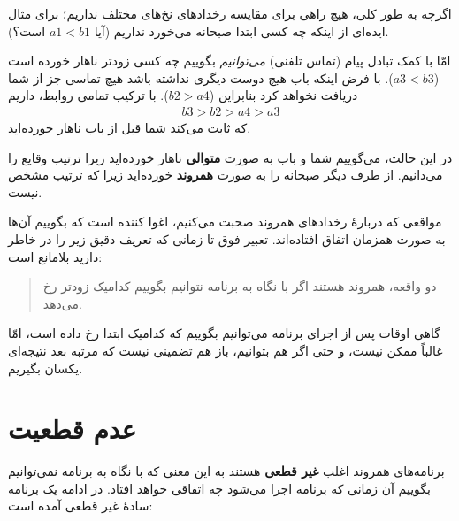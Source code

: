 \documentclass{book}
\begin{document}
    اگرچه به طور کلی، هیچ راهی برای مقایسه رخدادهای نخ‌های مختلف نداریم؛ برای مثال ایده‌ای از اینکه چه کسی ابتدا صبحانه می‌خورد نداریم 
    (آیا $a1 < b1$  است؟).
    
    امّا با کمک تبادل پیام (تماس تلفنی) \emph{می‌توانیم} بگوییم چه کسی زودتر ناهار خورده است ($a3 < b3$).
    با فرض اینکه باب هیچ دوست دیگری نداشته باشد هیچ تماسی جز از شما دریافت نخواهد کرد بنابراین  ($b2 > a4$).
    با ترکیب تمامی روابط، داریم 
%
\begin{eqnarray*}
b3 > b2 > a4 > a3
\end{eqnarray*}
%
    که ثابت می‌کند شما قبل از باب ناهار خورده‌اید. 

    در این حالت، می‌گوییم شما و باب به صورت \textbf{متوالی} ناهار خورده‌اید زیرا 
    ترتیب وقایع را می‌دانیم. از طرف دیگر صبحانه را به صورت  \textbf{همروند} خورده‌اید 
    زیرا که ترتیب مشخص نیست. 
    
    مواقعی که دربارهٔ رخدادهای همروند صحبت می‌کنیم، 
    اغوا کننده است که بگوییم آن‌ها به صورت همزمان اتفاق افتاده‌اند. 
    تعبیر فوق تا زمانی که تعریف دقیق زیر را در خاطر دارید بلامانع است:

\begin{quote}
    دو واقعه، همروند هستند اگر با نگاه به برنامه نتوانیم بگوییم کدامیک زودتر رخ می‌دهد. 
\end{quote}

    گاهی اوقات پس از اجرای برنامه می‌‌توانیم بگوییم که کدامیک ابتدا رخ داده است، امّا غالباً ممکن نیست، و حتی اگر هم بتوانیم، 
    باز هم تضمینی نیست که مرتبه بعد نتیجه‌ای یکسان بگیریم. 
\newpage
\section{عدم قطعیت}

    برنامه‌های همروند اغلب \textbf{غیر قطعی} هستند به این معنی که 
    با نگاه به برنامه نمی‌توانیم بگوییم آن زمانی که برنامه اجرا می‌شود چه اتفاقی خواهد افتاد. 
    در ادامه یک برنامه سادهٔ غیر قطعی آمده است:
\end{document}
